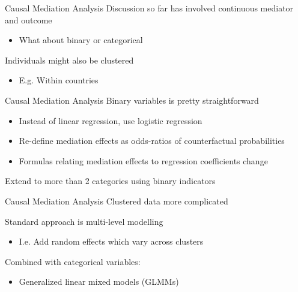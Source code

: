\documentclass[14pt]{beamer}
\newcommand{\CMA}{Causal Mediation Analysis}
\begin{document}
\begin{frame}{\CMA}
    Discussion so far has involved continuous mediator and outcome
    \begin{itemize}
        \item What about binary or categorical \newline
    \end{itemize}

    Individuals might also be clustered
    \begin{itemize}
        \item E.g. Within countries
    \end{itemize}

\end{frame}

\begin{frame}{\CMA}
    Binary variables is pretty straightforward
    \begin{itemize}
        \item Instead of linear regression, use logistic regression
        \item Re-define mediation effects as odds-ratios of counterfactual probabilities
        \item Formulas relating mediation effects to regression coefficients change \newline
    \end{itemize}

    Extend to more than 2 categories using binary indicators
\end{frame}

\begin{frame}{\CMA}
    Clustered data more complicated \newline

    Standard approach is multi-level modelling
    \begin{itemize}
        \item I.e. Add random effects which vary across clusters \newline
    \end{itemize}

    Combined with categorical variables: 
    \begin{itemize}
        \item Generalized linear mixed models (GLMMs)
    \end{itemize}
\end{frame}
\end{document}

